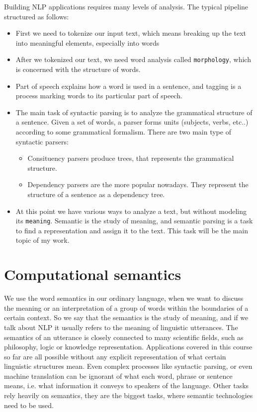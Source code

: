 Building NLP applications requires many levels of analysis.
The typical pipeline structured as follows:
\begin{itemize}
	\item First we need to tokenize our input text, which means breaking up the text into meaningful elements, especially into words
    \item After we tokenized our text, we need word analysis called \texttt{morphology}, which is concerned with the structure of words.
    \item Part of speech explains how a word is used in a sentence, and tagging is a process marking words to its particular part of speech.
    \item The main task of syntactic parsing is to analyze the grammatical structure of a sentence. Given a set of words, a parser forms units (subjects, verbs, etc..) according to some grammatical formalism.
    There are two main type of syntactic parsers:
    \begin{itemize}
        \item Consituency parsers produce trees, that represents the grammatical structure.
        \item Dependency parsers are the more popular nowadays. They represent the structure of a sentence as a dependency tree.
    \end{itemize}
    \item At this point we have various ways to analyze a text, but without modeling its \texttt{meaning}. Semantic is the study of meaning, and semantic parsing is a task to find a representation and assign it to the text. This task will be the main topic of my work.
\end{itemize}

\section{Computational semantics}
We use the word semantics in our ordinary language, when we want to discuss the meaning or an interpretation of a group of words within the boundaries of a certain context.
So we say that the semantics is the study of meaning, and if we talk about NLP it usually refers to the meaning of linguistic utterances.
The semantics of an utterance is closely connected to many scientific fields, such as philosophy, logic or knowledge representation.
Applications covered in this course so far are all possible without any explicit representation of what certain linguistic structures mean.
Even complex processes like syntactic parsing, or even machine translation can be ignorant of what each word, phrase or sentence means, i.e. what information it conveys to speakers of the language.
Other tasks rely heavily on semantics, they are the biggest tasks, where semantic technologies need to be used.

